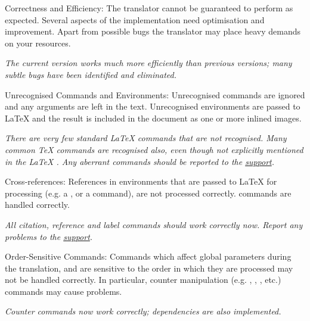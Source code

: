 \begin{htmllist}
\item [Correctness and Efficiency:\index{efficiency} ]
The translator cannot be guaranteed to perform as expected.
Several aspects of the implementation need
optimisation and improvement. Apart from possible bugs the translator 
may place heavy demands on your resources.
\begin{changebar}
\textit
{The current version works much more efficiently than previous
versions; many subtle bugs have been identified and eliminated.}
\end{changebar}

\item [Unrecognised Commands and Environments:\index{unrecognised commands} ]
Unrecognised commands are ignored and any arguments are left in the text. 
Unrecognised environments are passed to \LaTeX{}  and the result is
included in the document as one or more inlined images.
\begin{changebar}
\newline\textit
{There are very few standard \LaTeX{} commands that are not recognised.
Many common \TeX{} commands are recognised also,
even though not explicitly mentioned 
in the \LaTeX{} .
Any aberrant commands should be reported to the \latextohtml{}
\hyperref{mailing list}{mailing list, see Section~}{}{support}.}
\end{changebar}


\item [Cross-references:\index{cross-references} ]
References in environments that are passed to \LaTeX{}  for processing
(e.g. a , or a  command), 
are not processed correctly.
 commands are handled correctly.
\begin{changebar}
\newline\textit
{All citation, reference and label commands should work correctly now.
Report any problems to the \latextohtml{}
\hyperref{mailing list}{mailing list, see Section~}{}{support}.}
\end{changebar}

\item[Order-Sensitive Commands: ]
Commands which affect global parameters during the translation,
and are sensitive to the order in which they are processed may
not be handled correctly. In particular, counter manipulation
(e.g. , , , etc.) 
commands may cause problems.
\begin{changebar}
\newline\textit
{Counter commands now work correctly; dependencies
are also implemented.}
\end{changebar}


\end{htmllist}
